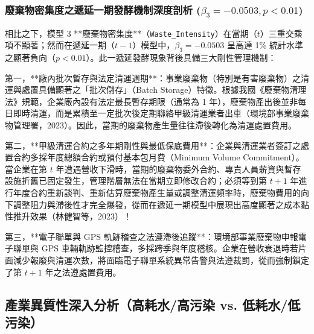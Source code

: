 \documentclass[12pt,a4paper]{article}
\begin{document}
\subsubsection{廢棄物密集度之遞延一期發酵機制深度剖析 \texorpdfstring{($\beta_3 = -0.0503, p < 0.01$)}{(beta3 = -0.0503, p < 0.01)}}

相比之下，模型 3 **廢棄物密集度**（\texttt{Waste\_Intensity}）在當期（$t$）三重交乘項不顯著；然而在遞延一期（$t-1$）模型中，$\beta_3 = -0.0503$ 呈高達 1\% 統計水準之顯著負向（$p < 0.01$）。此一遞延發酵現象背後具備三大剛性管理機制：

第一，**廠內批次暫存與法定清運週期**：事業廢棄物（特別是有害廢棄物）之清運與處置具備顯著之「批次儲存」（Batch Storage）特徵。根據我國《廢棄物清理法》規範，企業廠內設有法定最長暫存期限（通常為 1 年），廢棄物產出後並非每日即時清運，而是累積至一定批次後定期聯絡甲級清運業者出車（環境部事業廢棄物管理署，2023）。因此，當期的廢棄物產生量往往滯後轉化為清運處置費用。

第二，**甲級清運合約之多年期剛性與最低保底費用**：企業與清運業者簽訂之處置合約多採年度總額合約或預付基本包月費（Minimum Volume Commitment）。當企業在第 $t$ 年遭遇營收下滑時，當期的廢棄物委外合約、專責人員薪資與暫存設施折舊已固定發生，管理階層無法在當期立即修改合約；必須等到第 $t+1$ 年進行年度合約重新談判、重新估算廢棄物產生量或調整清運頻率時，廢棄物費用的向下調整阻力與滯後性才完全爆發，從而在遞延一期模型中展現出高度顯著之成本黏性推升效果（林健智等，2023）！

第三，**電子聯單與 GPS 軌跡稽查之法遵滯後追蹤**：環境部事業廢棄物申報電子聯單與 GPS 車輛軌跡監控稽查，多採跨季與年度稽核。企業在營收衰退時若片面減少報廢與清運次數，將面臨電子聯單系統異常告警與法遵裁罰，從而強制鎖定了第 $t+1$ 年之法遵處置費用。

\subsection{產業異質性深入分析（高耗水/高污染 vs. 低耗水/低污染）}
\end{document}
